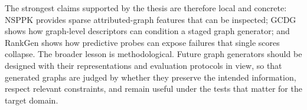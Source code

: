 The strongest claims supported by the thesis are therefore local and concrete:
NSPPK provides sparse attributed-graph features that can be inspected; GCDG
shows how graph-level descriptors can condition a staged graph generator; and
RankGen shows how predictive probes can expose failures that single scores
collapse. The broader lesson is methodological. Future graph generators should
be designed with their representations and evaluation protocols in view, so
that generated graphs are judged by whether they preserve the intended
information, respect relevant constraints, and remain useful under the tests
that matter for the target domain.
